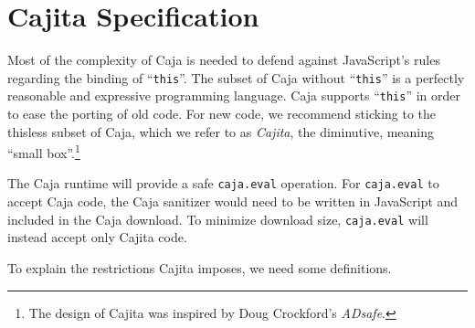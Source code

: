 \documentclass[letterpaper,twocolumn,10pt]{article}
\newcommand{\code}[1]{{\tt {#1}}}              %
\begin{document}
\section{Cajita Specification}
\label{sec:cajita-spec}

Most of the complexity of Caja is needed to defend against JavaScript's rules 
regarding the binding of ``\code{this}''. The subset of Caja without 
``\code{this}'' is a perfectly reasonable and expressive programming 
language. Caja supports ``\code{this}'' in order to ease the porting of old 
code. For new code, we recommend sticking to the thisless subset of Caja, 
which we refer to as \emph{Cajita}, the diminutive, meaning ``small 
box''.\footnote{
%
The design of Cajita was inspired by Doug Crockford's \emph{ADsafe}.
%
}

The Caja runtime will provide a safe \code{caja.eval} operation. For 
\code{caja.eval} to accept Caja code, the Caja sanitizer would need to be 
written in JavaScript and included in the Caja download. To minimize download 
size, \code{caja.eval} will instead accept only Cajita code.

To explain the restrictions Cajita imposes, we need some definitions.
\end{document}
